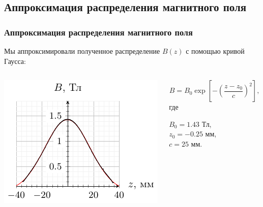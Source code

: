 \documentclass[10pt,pdf,hyperref={unicode}, dvipsnames]{beamer}
\begin{document}
\begin{frame}
	\subsection{Аппроксимация распределения магнитного поля}
	\frametitle{Аппроксимация распределения магнитного поля}
	Мы аппроксимировали полученное распределение $B(z)$ с помощью кривой Гаусса:\vspace{-1em}
	\begin{columns}
		\begin{column}{0.6\textwidth}
			\begin{center}
				\hspace{4em}
				\includegraphics[width=\textwidth]{images/b_from_z}
			\end{center}
		\end{column}
		\begin{column}[]{0.4\textwidth}
			\begin{equation*} 
				B=B_0%
				\exp 
				\left[
					-\left(
					\frac{z-z_0}{c}
					\right)^2
					\right], 
			\end{equation*}
			где 
			
			$B_0=1.43$ Тл, \\
			$z_0=-0.25$ мм,\\
			$c=25$ мм.
		\end{column}
	\end{columns}
\end{frame}
\end{document}
